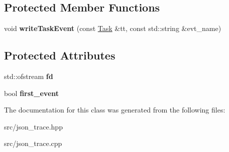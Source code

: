 \subsection*{Protected Member Functions}
\begin{DoxyCompactItemize}
\item 
void {\bfseries write\+Task\+Event} (const \hyperlink{classRTSim_1_1Task}{Task} \&tt, const std\+::string \&evt\+\_\+name)\hypertarget{classRTSim_1_1JSONTrace_a1a9b47ef7f596a5878b759f47fbaf47d}{}\label{classRTSim_1_1JSONTrace_a1a9b47ef7f596a5878b759f47fbaf47d}

\end{DoxyCompactItemize}
\subsection*{Protected Attributes}
\begin{DoxyCompactItemize}
\item 
std\+::ofstream {\bfseries fd}\hypertarget{classRTSim_1_1JSONTrace_afd69499912e86a79490f5e580dc4dc38}{}\label{classRTSim_1_1JSONTrace_afd69499912e86a79490f5e580dc4dc38}

\item 
bool {\bfseries first\+\_\+event}\hypertarget{classRTSim_1_1JSONTrace_a918542376d22baf8ad2e92c9000af5e5}{}\label{classRTSim_1_1JSONTrace_a918542376d22baf8ad2e92c9000af5e5}

\end{DoxyCompactItemize}


The documentation for this class was generated from the following files\+:\begin{DoxyCompactItemize}
\item 
src/json\+\_\+trace.\+hpp\item 
src/json\+\_\+trace.\+cpp\end{DoxyCompactItemize}
